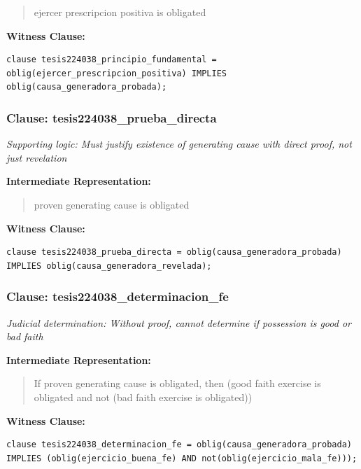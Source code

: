 \documentclass[11pt,a4paper]{article}
\begin{document}
\begin{quote}
ejercer prescripcion positiva is obligated
\end{quote}

\textbf{Witness Clause:}

\begin{lstlisting}[style=witnessstyle, language=Witness]
clause tesis224038_principio_fundamental = oblig(ejercer_prescripcion_positiva) IMPLIES oblig(causa_generadora_probada);
\end{lstlisting}

\subsubsection{Clause: tesis224038\_prueba\_directa}

\textit{Supporting logic: Must justify existence of generating cause with direct proof, not just revelation}

\textbf{Intermediate Representation:}

\begin{quote}
proven generating cause is obligated
\end{quote}

\textbf{Witness Clause:}

\begin{lstlisting}[style=witnessstyle, language=Witness]
clause tesis224038_prueba_directa = oblig(causa_generadora_probada) IMPLIES oblig(causa_generadora_revelada);
\end{lstlisting}

\subsubsection{Clause: tesis224038\_determinacion\_fe}

\textit{Judicial determination: Without proof, cannot determine if possession is good or bad faith}

\textbf{Intermediate Representation:}

\begin{quote}
If proven generating cause is obligated, then (good faith exercise is obligated and not (bad faith exercise is obligated))
\end{quote}

\textbf{Witness Clause:}

\begin{lstlisting}[style=witnessstyle, language=Witness]
clause tesis224038_determinacion_fe = oblig(causa_generadora_probada) IMPLIES (oblig(ejercicio_buena_fe) AND not(oblig(ejercicio_mala_fe)));
\end{lstlisting}
\end{document}
